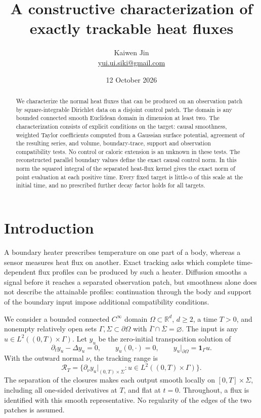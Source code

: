\documentclass[11pt]{article}
\title{A constructive characterization of exactly trackable heat fluxes}
\author{Kaiwen Jin\\
\small\href{mailto:yui.ui.siki@gmail.com}{yui.ui.siki@gmail.com}}
\date{12 October 2026}
\theoremstyle{remark}
\newcommand{\R}{\mathbb R}
\newcommand{\Om}{\Omega}
\newcommand{\dt}{\partial_t}
\newcommand{\dn}{\partial_\nu}
\newcommand{\calR}{\mathcal R}
\begin{document}
\maketitle
\begin{abstract}
We characterize the normal heat fluxes that can be produced on an observation
patch by square-integrable Dirichlet data on a disjoint control patch.
The domain is any bounded connected smooth Euclidean domain in dimension
at least two. The characterization consists of explicit conditions on the
target: causal smoothness, weighted Taylor coefficients computed from a
Gaussian surface potential, agreement of the resulting series, and
volume, boundary-trace, support and observation compatibility tests.
No control or caloric extension is an unknown in these tests.
The reconstructed parallel boundary values define the exact causal
control norm. In this norm the squared integral of the separated
heat-flux kernel gives the exact norm of point evaluation at each positive
time. Every fixed target is little-o of this scale at the initial time,
and no prescribed further decay factor holds for all targets.
\end{abstract}

\section{Introduction}

A boundary heater prescribes temperature on one part of a body, whereas a
sensor measures heat flux on another. Exact tracking asks which complete
time-dependent flux profiles can be produced by such a heater. Diffusion
smooths a signal before it reaches a separated observation patch, but
smoothness alone does not describe the attainable profiles: continuation
through the body and support of the boundary input impose additional
compatibility conditions.

We consider a bounded connected $C^\infty$ domain $\Om\subset\R^d$,
$d\geq2$, a time $T>0$, and nonempty relatively open sets
$\Gamma,\Sigma\subset\partial\Om$ with
$\overline\Gamma\cap\overline\Sigma=\varnothing$.
The input is any $u\in L^2((0,T)\times\Gamma)$.
Let $y_u$ be the zero-initial transposition solution of
\begin{equation}\label{eq:state}
 \dt y_u-\Delta y_u=0,\qquad y_u(0,\cdot)=0,\qquad
 y_u|_{\partial\Om}=\mathbf1_\Gamma u.
\end{equation}
With the outward normal $\nu$, the tracking range is
\begin{equation}\label{eq:range}
 \calR_T=\{\dn y_u|_{(0,T)\times\Sigma}:
                  u\in L^2((0,T)\times\Gamma)\}.
\end{equation}
The separation of the closures makes each output smooth locally on
$[0,T]\times\Sigma$, including all one-sided derivatives at $T$,
and flat at $t=0$.
Throughout, a flux is identified with this smooth representative.
No regularity of the edges of the two patches is assumed.
\end{document}
